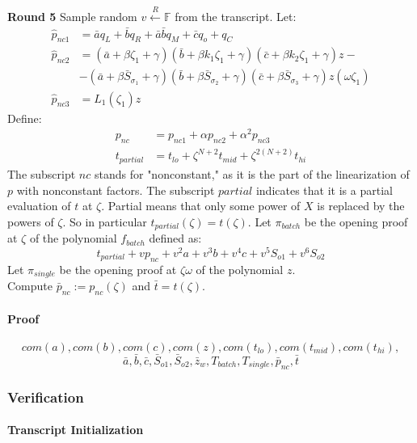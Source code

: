 \documentclass[../lecture-notes.tex]{subfiles}
\begin{document}
\textcolor{green!60!black}{\textbf{Round 5}} Sample random $v \xleftarrow{R}
\mathbb{F}$ from the transcript. Let:
\begin{align*}
\hat{p}_{nc1} &= \bar{a}q_L + \bar{b}q_R + \bar{a}\bar{b}q_M + \bar{c}q_o + q_C \\
\hat{p}_{nc2} &= (\bar{a} + \beta \zeta_1 + \gamma)(\bar{b} + \beta k_1 \zeta_1 + \gamma)(\bar{c} + \beta k_2 \zeta_1 + \gamma) z -\\
&- (\bar{a} + \beta \bar{S}_{\sigma_1} + \gamma)(\bar{b} + \beta \bar{S}_{\sigma_2} + \gamma)(\bar{c} + \beta \bar{S}_{\sigma_3} + \gamma) z(\omega \zeta_1) \\
\hat{p}_{nc3} &= L_1(\zeta_1)z
\end{align*}
Define:
\begin{align*}
p_{nc} &= p_{nc1} + \alpha p_{nc2} + \alpha^2 p_{nc3} \\
t_{partial} &= t_{lo} + \zeta^{N+2}t_{mid} + \zeta^{2(N+2)}t_{hi}
\end{align*}
The subscript $nc$ stands for "nonconstant," as it is the part of the linearization of $p$ with nonconstant factors. The subscript $partial$ indicates that it is a partial evaluation of $t$ at $\zeta$. Partial means that only some power of $X$ is replaced by the powers of $\zeta$. So in particular $t_{partial}(\zeta) = t(\zeta)$.
Let $\pi_{batch}$ be the opening proof at $\zeta$ of the polynomial $f_{batch}$ defined as: 
\[t_{partial} + v p_{nc} + v^2 a + v^3 b + v^4 c + v^5 S_{o1} + v^6 S_{o2}\]
Let $\pi_{single}$ be the opening proof at $\zeta\omega$ of the polynomial $z$. \\
Compute $\bar{p}_{nc} := p_{nc}(\zeta)$ and $\bar{t} = t(\zeta)$.

\paragraph{Proof}
\[com(a), com(b), com(c), com(z), com(t_{lo}), com(t_{mid}), com(t_{hi}),\] 
\[\bar{a}, \bar{b}, \bar{c}, \bar{S}_{o1}, \bar{S}_{o2}, \bar{z}_w, T_{batch}, T_{single}, \bar{p}_{nc}, \bar{t}\]

\subsubsection{Verification}

\paragraph{Transcript Initialization}
\end{document}
